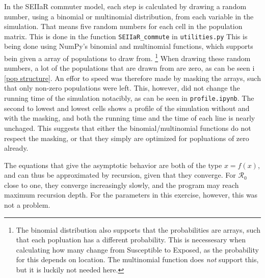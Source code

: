 \documentclass{article}
\begin{document}
    In the SEIIaR commuter model, each step is calculated by drawing a random number, using a binomial or multinomial distribution, from each variable in the simulation.
    That means five random numbers for each cell in the population matrix.
    This is done in the function \verb|SEIIaR_commute| in \verb|utilities.py|
    This is being done using NumPy's binomial and multinomial functions, which supports bein given a array of populations to draw from.
    \footnote{The binomial distribution also supports that the probabilities are arrays, such that each popluation has a different probability.
    This is necessesary when calculating how many change from Susceptible to Exposed, as the probability for this depends on location.
    The multinomial function does \emph{not} support this, but it is luckily not needed here.}
    When drawing these random numbers, a lot of the populations that are drawn from are zero, as can be seen i \autoref{pop structure}.
    An effor to speed was therefore made by masking the arrays, such that only non-zero populations were left.
    This, however, did not change the running time of the simulation notacibly, as can be seen in \verb|profile.ipynb|.
    The second to lowest and lowest cells shows a profile of the simulation without and with the masking, and both the running time and the time of each line is nearly unchaged.
    This suggests that either the binomial/multinomial functions do not respect the masking, or that they simply are optimized for popluations of zero already.


    The equations that give the asymptotic behavior are both of the type $x = f(x)$, and can thus be approximated by recursion, given that they converge. 
    For $\mathcal{R}_0$ close to one, they converge increasingly slowly, and the program may reach maximum recursion depth. 
    For the parameters in this exercise, however, this was not a problem.
\end{document}

